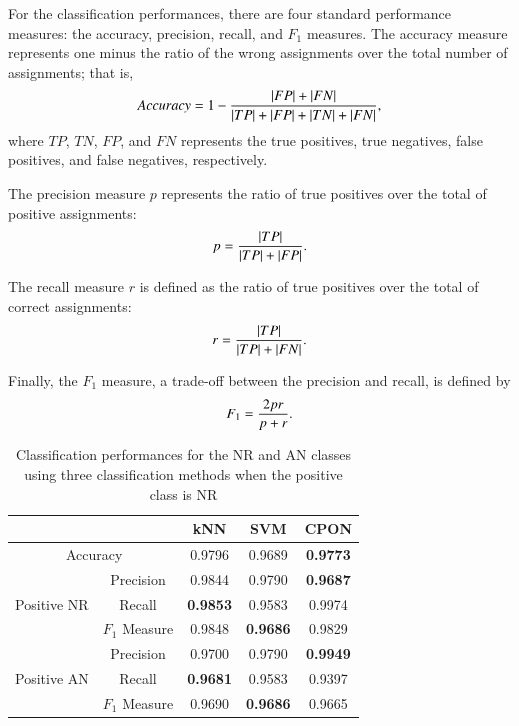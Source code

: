 \documentclass[times,twocolumn,final,authoryear]{elsarticle}
\begin{document}
For the classification performances, there are four standard performance measures: the accuracy, precision, recall, and $F_1$ measures. 
The accuracy measure represents one minus the ratio of the wrong assignments over the total number of assignments; that is,
\begin{equation}
Accuracy=1- {{|FP|+|FN|}\over{|TP|+|FP|+|TN|+|FN|}},
\end{equation}
where $TP$, $TN$, $FP$, and $FN$ represents the true positives, true negatives, false positives, and false negatives, respectively.
 
The precision measure $p$ represents the ratio of true positives over the total of positive assignments:
\begin{equation}
p= {|TP|\over{|TP|+|FP|}}.
\end{equation}

The recall measure $r$ is defined as the ratio of true positives over the total of correct assignments:
\begin{equation}
r= {|TP|\over{|TP|+|FN|}}.
\end{equation}

Finally, the $F_1$ measure, a trade-off between the precision and recall, is defined by
\begin{equation}
F_1= {2pr\over{p+r}}.	
\end{equation}

\iffalse
\begin{table}[!t]
\caption{Classification performances for the NR and AN classes using three classification methods when the positive class is NR} \label{T2}
\begin{center}
\begin{tabular}{|c|c|c|c|c|}\hline\hline
\multicolumn{2}{|c|}{}& kNN     & SVM   & CPON \\ \hline\hline
\multicolumn{2}{|c|}{Accuracy}         
& 0.9796  & 0.9689  & {\bf 0.9773} \\ \hline
\multirow{3}{*}{Positive NR} &  Precision 
& 0.9844  & 0.9790  & {\bf 0.9687} \\ \cline{2-5}
& Recall   
& {\bf 0.9853}  & 0.9583 & 0.9974 \\ \cline{2-5}
& $F_1$ Measure 
& 0.9848  & {\bf 0.9686} & 0.9829 \\ \hline
\multirow{3}{*}{Positive AN} &  Precision  
& 0.9700  & 0.9790  & {\bf 0.9949} \\ \cline{2-5}
& Recall   
& {\bf 0.9681}  & 0.9583 & 0.9397 \\ \cline{2-5}
& $F_1$ Measure 
& 0.9690  & {\bf 0.9686} & 0.9665 \\ \hline
\end{tabular}
\end{center}
\end{table}
\end{document}
